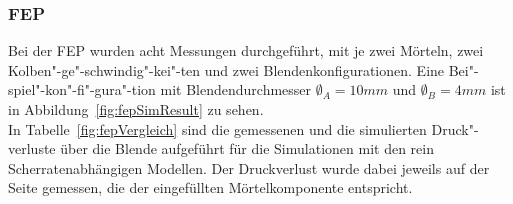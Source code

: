 \subsubsection{FEP}
Bei der FEP wurden acht Messungen durchgeführt, mit je zwei Mörteln, zwei Kolben"-ge"-schwindig"-kei"-ten und zwei Blendenkonfigurationen. Eine Bei"-spiel"-kon"-fi"-gura"-tion mit Blendendurchmesser $\emptyset_A=10mm$ und $\emptyset_B=4mm$ ist in Abbildung~\ref{fig:fepSimResult} zu sehen.\\
In Tabelle~\ref{fig:fepVergleich} sind die gemessenen und die simulierten Druck"-verluste über die Blende aufgeführt für die Simulationen mit den rein Scherratenabhängigen Modellen. Der Druckverlust wurde dabei jeweils auf der Seite gemessen, die der eingefüllten Mörtelkomponente entspricht.
%
\begin{table}[tb]
\noindent{}
\end{table}
